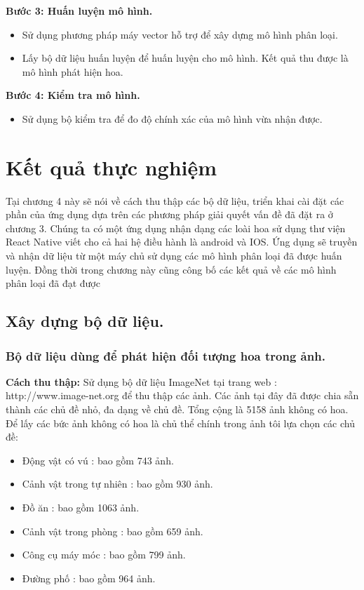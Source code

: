 \documentclass[12pt]{report}
\begin{document}
		\textbf{Bước 3: Huấn luyện mô hình.} 
		\begin{itemize}
			\item Sử dụng phương pháp máy vector hỗ trợ để xây dựng mô hình phân loại.
			\item Lấy bộ dữ liệu huấn luyện để huấn luyện cho mô hình. Kết quả thu được là mô hình phát hiện hoa.
		\end{itemize}
										
		\textbf{Bước 4: Kiểm tra mô hình.} 
		\begin{itemize}
			\item Sử dụng bộ kiểm tra để đo độ chính xác của mô hình vừa nhận được.
		\end{itemize}
											
		\chapter{Kết quả thực nghiệm}
		\label{chap:Experimental results}
		Tại chương 4 này sẽ nói về cách thu thập các bộ dữ liệu, triển khai cài đặt các phần của ứng dụng dựa trên các phương pháp giải quyết vấn đề đã đặt ra ở chương 3. Chúng ta có một ứng dụng nhận dạng các loài hoa sử dụng thư viện React Native viết cho cả hai hệ điều hành là android và IOS. Ứng dụng sẽ truyền và nhận dữ liệu từ một máy chủ sử dụng các mô hình phân loại đã được huấn luyện. Đồng thời trong chương này cũng công bố các kết quả về các mô hình phân loại đã đạt được
										
		\section{Xây dựng bộ dữ liệu.}
		\subsection{Bộ dữ liệu dùng để phát hiện đối tượng hoa trong ảnh.}
										
		\textbf{Cách thu thập:} Sử dụng bộ dữ liệu ImageNet tại trang web : http://www.image-net.org để thu thập các ảnh. Các ảnh tại đây đã được chia sẵn thành các chủ đề nhỏ, đa dạng về chủ đề. Tổng cộng là 5158 ảnh không có hoa. Để lấy các bức ảnh không có hoa là chủ thể chính trong ảnh tôi lựa chọn các chủ đề: 
		\begin{itemize}
			\item Động vật có vú		: bao gồm 743 ảnh.
			\item Cảnh vật trong tự nhiên	: bao gồm 930 ảnh.
			\item Đồ ăn			: bao gồm 1063 ảnh.
			\item Cảnh vật trong phòng	: bao gồm 659 ảnh.
			\item Công cụ máy móc		: bao gồm 799 ảnh.
			\item Đường phố			: bao gồm 964 ảnh.
		\end{itemize}	
											
\end{document}
